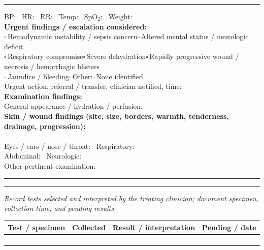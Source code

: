 \documentclass[10pt,a4paper]{article}
\newcommand{\boxx}{\ensuremath{\square}}
\newcommand{\checkitem}[1]{\boxx\,#1\quad}
\newcommand{\linefield}[2]{#1\ \underline{\hspace{#2}}}
\newcommand{\writearea}[1]{\vspace{1pt}\par\noindent\rule{\linewidth}{0.35pt}\par\vspace{#1}}
\newcommand{\sectionbar}[1]{\vspace{3pt}{\large\bfseries #1}\par\vspace{1pt}\hrule\vspace{3pt}}
\begin{document}
\sectionbar{5. Examination and initial acuity}
\linefield{BP:}{2.2cm} \linefield{HR:}{2.0cm} \linefield{RR:}{2.0cm} \linefield{Temp:}{2.0cm} \linefield{SpO$_2$:}{2.0cm} \linefield{Weight:}{2.0cm}\\
\textbf{Urgent findings / escalation considered:}\\
\checkitem{Hemodynamic instability / sepsis concern}\checkitem{Altered mental status / neurologic deficit}\\
\checkitem{Respiratory compromise}\checkitem{Severe dehydration}\checkitem{Rapidly progressive wound / necrosis / hemorrhagic blisters}\\
\checkitem{Jaundice / bleeding}\checkitem{Other:}\underline{\hspace{3.5cm}}\quad\checkitem{None identified}\\
\linefield{Urgent action, referral / transfer, clinician notified, time:}{5.0cm}\\
\textbf{Examination findings:}\\
\linefield{General appearance / hydration / perfusion:}{7.0cm}\\
\textbf{Skin / wound findings (site, size, borders, warmth, tenderness, drainage, progression):}\\
\underline{\hspace{15cm}}\\
\linefield{Eyes / ears / nose / throat:}{8.0cm} \linefield{Respiratory:}{4.3cm}\\
\linefield{Abdominal:}{5.0cm} \linefield{Neurologic:}{5.7cm}\\
\linefield{Other pertinent examination:}{7.0cm}
\writearea{4mm}

\sectionbar{6. Investigations and results}
\textit{Record tests selected and interpreted by the treating clinician; document specimen, collection time, and pending results.}\\
\begin{tabularx}{\linewidth}{|>{\raggedright\arraybackslash}p{3.5cm}|>{\raggedright\arraybackslash}p{2.4cm}|X|>{\raggedright\arraybackslash}p{2.4cm}|}
\hline
Test / specimen & Collected & Result / interpretation & Pending / date \\
\hline
\rule{0pt}{7mm} & & & \\\hline
\rule{0pt}{7mm} & & & \\\hline
\rule{0pt}{7mm} & & & \\\hline
\rule{0pt}{7mm} & & & \\\hline
\end{tabularx}
\end{document}
